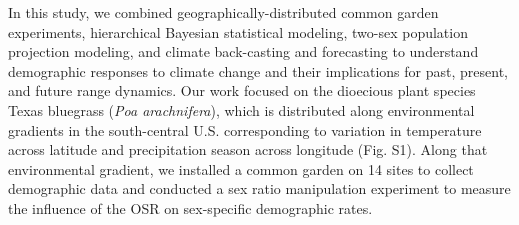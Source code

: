 \documentclass[9pt,twocolumn,twoside,lineno]{pnas-new}
\newcommand{\tom}[2]{{\color{red}{#1}}\footnote{\textit{\color{red}{#2}}}}
\begin{document}
%
In this study,  we combined geographically-distributed common garden experiments, hierarchical Bayesian statistical modeling, two-sex population projection modeling, and climate back-casting and forecasting to understand demographic responses to climate change and their implications for past, present, and future range dynamics. 
Our work focused on the dioecious plant species Texas bluegrass (\textit{Poa arachnifera}), which
is distributed along environmental gradients in the south-central U.S. corresponding to variation in temperature across latitude and precipitation season across longitude (Fig. S1). 
Along that environmental gradient, we installed a common garden on 14 sites  to collect demographic data and conducted a sex ratio manipulation experiment to measure the influence of the OSR on sex-specific demographic rates.
\end{document}
